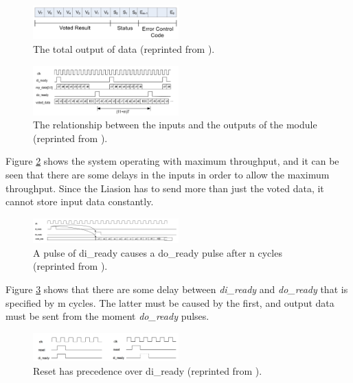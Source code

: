 \documentclass[a4paper]{IEEEtran}
\begin{document}
\begin{figure}[h!]
    \centering
    \includegraphics[width=0.5\textwidth]{Figures/ProjectDescription/LiaisonOutput}
    \caption{The total output of data (reprinted from \protect\cite{assignment-text}).}
    \label{fig:LiaisonOutput}
\end{figure}

\begin{figure}[h!]
    \centering
    \includegraphics[width=0.5\textwidth]{Figures/ProjectDescription/LiaisonInputOutput}
    \caption{The relationship between the inputs and the outputs of the module (reprinted from \protect\cite{assignment-text}).}
    \label{fig:LiaisonInputOutput}
\end{figure}

Figure \ref{fig:LiaisonInputOutput} shows the system operating with maximum throughput, and it can be seen that there are some delays in the inputs in order to allow the maximum throughput.
Since the Liasion has to send more than just the voted data, it cannot store input data constantly.

\begin{figure}[h!]
    \centering
    \includegraphics[width=0.5\textwidth]{Figures/ProjectDescription/LiaisonDiReadyDoReady}
    \caption{A pulse of di\_ready causes a do\_ready pulse after n cycles (reprinted from \protect\cite{assignment-text}).}
    \label{fig:LiaisonDiReadyDoReady}
\end{figure}

Figure \ref{fig:LiaisonDiReadyDoReady} shows that there are some delay between \textit{di\_ready} and \textit{do\_ready} that is specified by m cycles.
The latter must be caused by the first, and output data must be sent from the moment \textit{do\_ready} pulses.

\begin{figure}[h!]
    \centering
    \includegraphics[width=0.5\textwidth]{Figures/ProjectDescription/LiaisonResetDiReady}
    \caption{Reset has precedence over di\_ready (reprinted from \protect\cite{assignment-text}).}
    \label{fig:LiaisonResetDiReady}
\end{figure}
\end{document}
